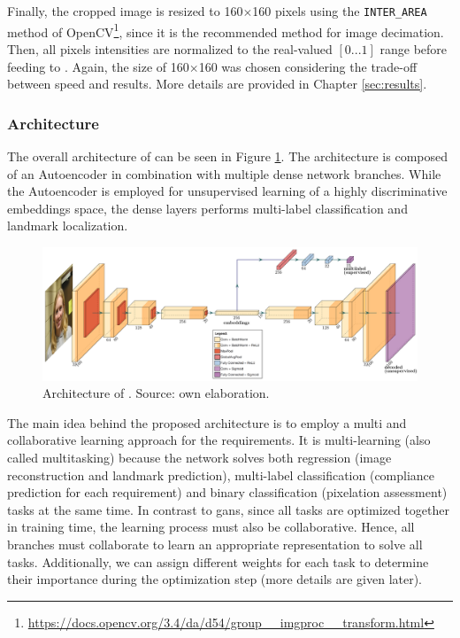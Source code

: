 Finally, the cropped image is resized to 160$\times$160 pixels using the \texttt{INTER\_AREA} method of OpenCV\footnote{\url{https://docs.opencv.org/3.4/da/d54/group__imgproc__transform.html}}, since it is the recommended method for image decimation. Then, all pixels intensities are normalized to the real-valued $[0...1]$ range before feeding to \methodname. Again, the size of 160$\times$160 was chosen considering the trade-off between speed and results. More details are provided in Chapter \ref{sec:results}. 

\subsubsection{Architecture}

The overall architecture of \methodname can be seen in Figure \ref{fig:icaonet}. The architecture is composed of an Autoencoder in combination with multiple dense network branches. While the Autoencoder is employed for unsupervised learning of a highly discriminative embeddings space, the dense layers performs multi-label classification and landmark localization.

\begin{figure}[tb]
\centering
\includegraphics[width=\linewidth]{images/icaonet.pdf}
\caption{Architecture of \methodname. Source: own elaboration.}
\label{fig:icaonet}
\end{figure}

The main idea behind the proposed architecture is to employ a multi and collaborative learning approach for the \icao requirements. It is multi-learning (also called multitasking) because the network solves both regression (image reconstruction and landmark prediction), multi-label classification (compliance prediction for each requirement) and binary classification (pixelation assessment) tasks at the same time. In contrast to \acfp{gan}, since all tasks are optimized together in training time, the learning process must also be collaborative. Hence, all branches must collaborate to learn an appropriate representation to solve all tasks. Additionally, we can assign different weights for each task to determine their importance during the optimization step (more details are given later).

